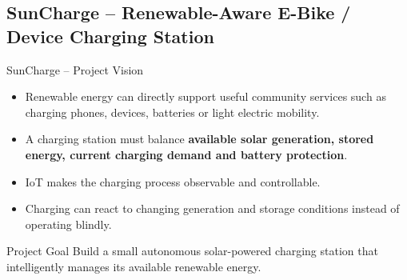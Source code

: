 \subsection{SunCharge -- Renewable-Aware E-Bike / Device Charging Station}

\begin{frame}{SunCharge -- Project Vision}
\begin{itemize}
    \item Renewable energy can directly support useful community services such as charging phones, devices, batteries or light electric mobility.
    \item A charging station must balance \textbf{available solar generation, stored energy, current charging demand and battery protection}.
    \item IoT makes the charging process observable and controllable.
    \item Charging can react to changing generation and storage conditions instead of operating blindly.
\end{itemize}

\begin{block}{Project Goal}
Build a small autonomous solar-powered charging station that intelligently manages its available renewable energy.
\end{block}
\end{frame}
